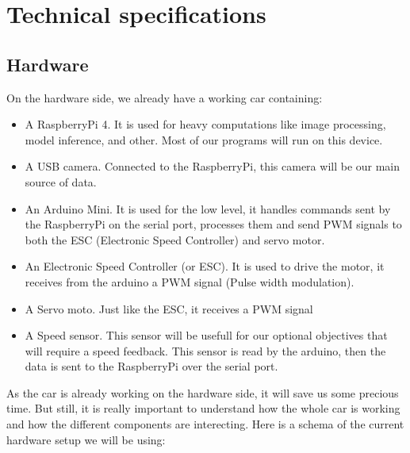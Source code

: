 \documentclass[12pt]{article}
\begin{document}
\section{Technical specifications}

\subsection{Hardware}
On the hardware side, we already have a working car containing:
\begin{itemize}
\item A RaspberryPi 4. It is used for heavy computations like image processing, model inference, and other. Most of our programs will run on this device.
\item A USB camera. Connected to the RaspberryPi, this camera will be our main source of data.
\item An Arduino Mini. It is used for the low level, it handles commands sent by the RaspberryPi on the serial port, processes them and send PWM signals to both the ESC (Electronic Speed Controller) and servo motor.
\item An Electronic Speed Controller (or ESC). It is used to drive the motor, it receives  from the arduino a PWM signal (Pulse width modulation).
\item A Servo moto. Just like the ESC, it receives a PWM signal
\item A Speed sensor. This sensor will be usefull for our optional objectives that will require a speed feedback. This sensor is read by the arduino, then the data is sent to the RaspberryPi over the serial port.
\end{itemize}

As the car is already working on the hardware side, it will save us some precious time. But still, it is really important to understand how the whole car is working and how the different components are interecting.
Here is a schema of the current hardware setup we will be using:
\newpage

\end{document}
